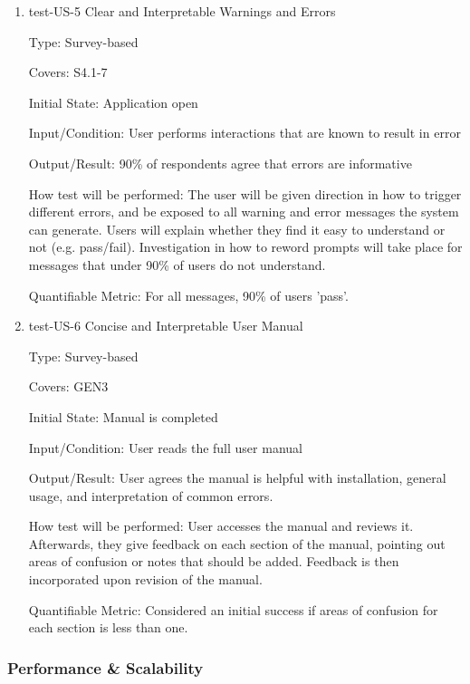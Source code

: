\documentclass[12pt, titlepage]{article}
\begin{document}
\begin{enumerate}
\item{test-US-5 Clear and Interpretable Warnings and Errors\\}

Type: Survey-based

Covers: S4.1-7 %
					
Initial State: Application open
					
Input/Condition: User performs interactions that are known to result in error
					
Output/Result: 90\% of respondents agree that errors are informative
					
How test will be performed: The user will be given direction in how to trigger different errors, and be exposed to
all warning and error messages the system can generate. Users will explain whether they find it easy to understand
or not (e.g. pass/fail). Investigation in how to reword prompts will take place for messages that under 90\% of users
do not understand.

Quantifiable Metric: For all messages, 90\% of users 'pass'.

\item{test-US-6 Concise and Interpretable User Manual\\}

Type: Survey-based

Covers: GEN3 %
					
Initial State: Manual is completed
					
Input/Condition: User reads the full user manual
					
Output/Result: User agrees the manual is helpful with installation, general usage, and interpretation of common errors.
					
How test will be performed: User accesses the manual and reviews it. Afterwards, they give feedback on each section of 
the manual, pointing out areas of confusion or notes that should be added. Feedback is then incorporated upon revision
of the manual.

Quantifiable Metric: Considered an initial success if areas of confusion for each section is less than one.

\end{enumerate}

\subsubsection{Performance \& Scalability}
\end{document}
